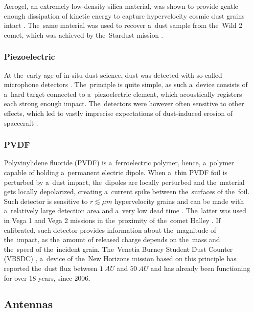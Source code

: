 Aerogel, an extremely low-density silica material, was shown to provide gentle enough dissipation of kinetic energy to capture hypervelocity cosmic dust grains intact \citep{tsou1995silica}. The~same material was used to recover a~dust sample from the~{Wild 2} comet, which was achieved by the~Stardust mission \citep{brownlee2014stardust}. 

\subsubsection{Piezoelectric}

At the~early age of in-situ dust science, dust was detected with so-called microphone detectors \citep{alexander1963review}. The~principle is quite simple, as such a~device consists of a~hard target connected to a~piezoelectric element, which acoustically registers each strong enough impact. The~detectors were however often sensitive to other effects, which led to vastly imprecise expectations of dust-induced erosion of spacecraft \citep{whipple1958meteoritic}. 

\subsubsection{PVDF} 

Polyvinylidene fluoride ({PVDF}) is a~ferroelectric polymer, hence, a~polymer capable of holding a~permanent electric dipole. When a~thin PVDF foil is perturbed by a~dust impact, the~dipoles are locally perturbed and the~material gets locally depolarized, creating a~current spike between the~surfaces of the~foil. Such detector is sensitive to $r \lesssim \si{\mu m}$ hypervelocity grains and can be made with a~relatively large detection area and a~very low dead time \citep{tuzzolino1996applications}. The~latter was used in Vega 1 and Vega 2 missions in the~proximity of the~comet {Halley} \citep{simpson1988dust}. If calibrated, such detector provides information about the~magnitude of the~impact, as the~amount of released charge depends on the~mass and the~speed of the~incident grain. The~Venetia Burney Student Dust Counter ({VBSDC}) \citep{james2010pvdf}, a~device of the~New Horizons mission based on this principle has reported the~dust flux between $\SI{1}{AU}$ and $\SI{50}{AU}$ \citep{bernardoni2022student} and has already been functioning for over $18$ years, since 2006. 

\subsection{Antennas}

